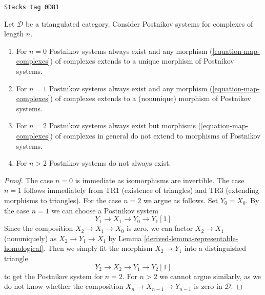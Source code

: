 \begin{lemma}
\label{derived-lemma-postnikov-system-small-cases}
\href{https://stacks.math.columbia.edu/tag/0D81}{\texttt{Stacks tag 0D81}}

Let $\mathcal{D}$ be a triangulated category. Consider
Postnikov systems for complexes of length $n$.
\begin{enumerate}
\item For $n = 0$ Postnikov systems always exist and
any morphism (\ref{equation-map-complexes}) of complexes
extends to a unique morphism of Postnikov systems.
\item For $n = 1$ Postnikov systems always exist and
any morphism (\ref{equation-map-complexes}) of complexes
extends to a (nonunique) morphism of Postnikov systems.
\item For $n = 2$ Postnikov systems always exist but
morphisms (\ref{equation-map-complexes}) of complexes
in general do not extend to morphisms of Postnikov systems.
\item For $n > 2$ Postnikov systems do not always exist.
\end{enumerate}
\end{lemma}

\begin{proof}

The case $n = 0$ is immediate as isomorphisms are invertible.
The case $n = 1$ follows immediately from TR1 (existence of triangles)
and TR3 (extending morphisms to triangles).
For the case $n = 2$ we argue as follows.
Set $Y_0 = X_0$. By the case $n = 1$ we can choose
a Postnikov system
$$
Y_1 \to X_1 \to Y_0 \to Y_1[1]
$$
Since the composition $X_2 \to X_1 \to X_0$ is zero, we can factor
$X_2 \to X_1$ (nonuniquely) as $X_2 \to Y_1 \to X_1$ by
Lemma \ref{derived-lemma-representable-homological}.
Then we simply fit the morphism $X_2 \to Y_1$ into a distinguished
triangle
$$
Y_2 \to X_2 \to Y_1 \to Y_2[1]
$$
to get the Postnikov system for $n = 2$.
For $n > 2$ we cannot argue similarly, as we do not
know whether the composition $X_n \to X_{n - 1} \to Y_{n - 1}$
is zero in $\mathcal{D}$.
\end{proof}

